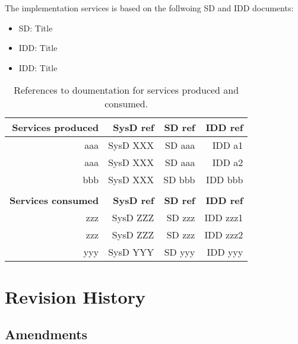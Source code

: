\documentclass[a4paper]{arrowhead}
\begin{document}
\color{red}
The implementation services is based on the follwoing SD and IDD
documents:
\begin{itemize}
\item SD: {Title \cite{.....}}
\item IDD: {Title \cite{.....}} %
\item IDD: {Title \cite{.....}} %
\end{itemize}

\begin{table*}[ht!]
  \centering
  \caption{References to doumentation for services produced and
    consumed. }
  \label{tab:services}
  \begin{tabular}{|r|r|r|r|}
    \hline
    \rowcolor{gray!33}\textbf{Services produced} & \textbf{SysD ref} & \textbf{SD ref} & \textbf{IDD ref} \\
    \hline
 
    aaa & SysD XXX & SD aaa & IDD a1 \\ \hline %
    aaa & SysD XXX & SD aaa & IDD a2 \\ \hline %

    bbb & SysD XXX & SD bbb & IDD bbb \\ \hline

    &&& \\ \hline

    \rowcolor{gray!33}\textbf{Services consumed} & \textbf{SysD ref} & \textbf{SD ref} & \textbf{IDD ref}\\
    \hline
    zzz & SysD ZZZ & SD zzz & IDD zzz1 \\ \hline %
    zzz & SysD ZZZ & SD zzz & IDD zzz2 \\ \hline %
    yyy & SysD YYY & SD yyy & IDD yyy \\ \hline
    
  \end{tabular}
\end{table*}

\color{black}






\newpage

\section{Revision History}
\subsection{Amendments}
\end{document}
